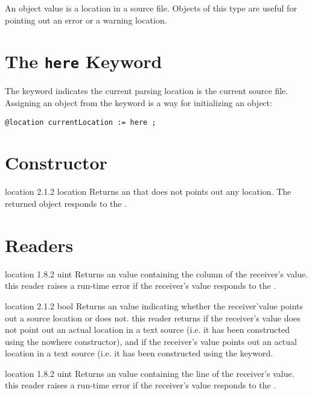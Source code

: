 

An  object value is a location in a source file. Objects of this type are useful for pointing out an error or a warning location.

\section{The \texttt{here} Keyword}

The  keyword indicates the current parsing location is the current source file. Assigning an  object from the  keyword is a way for initializing an  object:\newline

\texttt{@location currentLocation := here ;}

\section{Constructor}

{location}
{2.1.2}
{location}
{Returns an  that does not points out any location.}
{The returned object responds  to the .}

\section{Readers}

{location}
{1.8.2}
{uint}
{Returns an  value containing the column of the receiver's value.}
{this reader raises a run-time error if the receiver's value responds  to the .}


{location}
{2.1.2}
{bool}
{Returns an  value indicating whether the receiver'value points out a source location or does not.}
{this reader returns  if the receiver's value does not point out an actual location in a text source (i.e. it has been constructed using the nowhere constructor), and  if the receiver's value points out an actual location in a text source (i.e. it has been constructed using the  keyword.}


{location}
{1.8.2}
{uint}
{Returns an  value containing the line of the receiver's value.}
{this reader raises a run-time error if the receiver's value responds  to the .}


